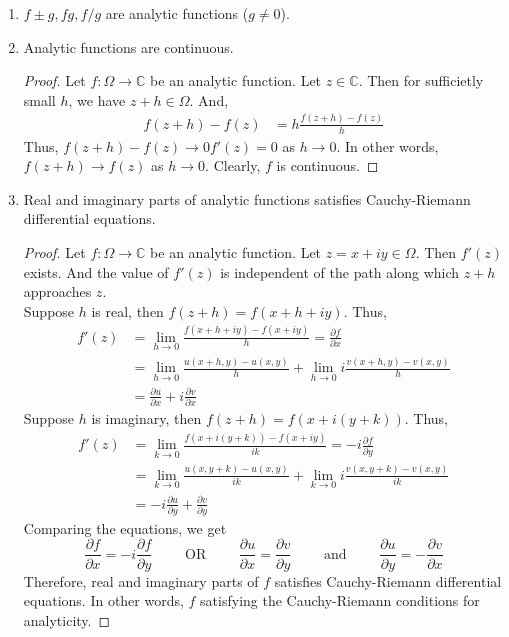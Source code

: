 \begin{enumerate}
	\item $f \pm g, fg, f/g$ are analytic functions ($g \ne 0$).

	\item Analytic functions are continuous.
	\begin{proof}
		Let $f : \Omega \to \mathbb{C}$ be an analytic function.
		Let $z \in \mathbb{C}$.
		Then for sufficietly small $h$, we have $z+h \in \Omega$.
		And,
		\begin{align*}
			f(z+h) - f(z) 
			& =  h\frac{f(z+h)-f(z)}{h}
		\end{align*}
		Thus, $f(z+h)-f(z) \to 0f'(z) = 0$ as $h \to 0$.
		In other words, $f(z+h) \to f(z)$ as $h \to 0$.
		Clearly, $f$ is continuous.
	\end{proof}

	\item Real and imaginary parts of analytic functions satisfies Cauchy-Riemann differential equations.
	\begin{proof}
		Let $f : \Omega \to \mathbb{C}$ be an analytic function.
		Let $z = x+iy \in \Omega$.
		Then $f'(z)$ exists.
		And the value of $f'(z)$ is independent of the path along which $z+h$ approaches $z$.\\

		Suppose $h$ is real, then $f(z+h) = f(x+h+iy)$. Thus,
		\begin{align}
			f'(z) 
			& = \lim_{h \to 0} \frac{f(x+h+iy)-f(x+iy)}{h} = \frac{\partial f}{\partial x} \\
			& = \lim_{h \to 0} \frac{u(x+h,y)-u(x,y)}{h} + \lim_{h \to 0} i\frac{v(x+h,y)-v(x,y)}{h} \nonumber \\
			& = \frac{\partial u}{\partial x} + i \frac{\partial v}{\partial x} 
		\end{align}
		Suppose $h$ is imaginary, then $f(z+h) = f(x+i(y+k))$.
		Thus,
		\begin{align}
			f'(z) 
			& = \lim_{k \to 0} \frac{f(x+i(y+k)) - f(x+iy)}{ik} = -i\frac{\partial f}{\partial y} \\
			& = \lim_{k \to 0} \frac{u(x,y+k)-u(x,y)}{ik} + \lim_{k \to 0} i\frac{v(x,y+k)-v(x,y)}{ik} \nonumber \\
			& = -i\frac{\partial u}{\partial y} + \frac{\partial v}{\partial y}
		\end{align}
		Comparing the equations, we get
		\begin{equation*}
			\frac{\partial f}{\partial x} = -i\frac{\partial f}{\partial y} \qquad \text{ OR } \qquad \frac{\partial u}{\partial x} = \frac{\partial v}{\partial y} \qquad \text{ and } \qquad \frac{\partial u}{\partial y} = -\frac{\partial v}{\partial x}
		\end{equation*}
		Therefore, real and imaginary parts of $f$ satisfies Cauchy-Riemann differential equations.	
		In other words, $f$ satisfying the Cauchy-Riemann conditions for analyticity.
	\end{proof}


\end{enumerate}

